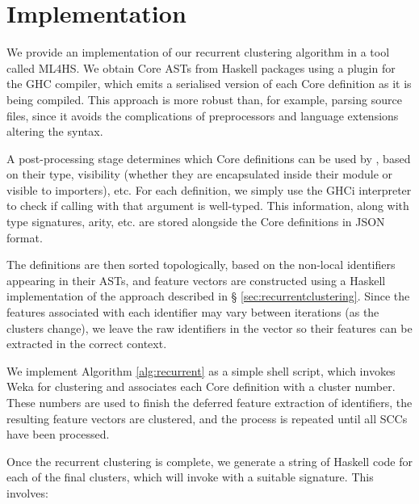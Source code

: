 \section{Implementation}
\label{sec:implementation}

We provide an implementation of our recurrent clustering algorithm in a tool
called \textsc{ML4HS}. We obtain Core ASTs from Haskell packages using a plugin
for the GHC compiler, which emits a serialised version of each Core definition
as it is being compiled. This approach is more robust than, for example, parsing
source files, since it avoids the complications of preprocessors and language
extensions altering the syntax.

A post-processing stage determines which Core definitions can be used by
\qspec{}, based on their type, visibility (whether they are encapsulated inside
their module or visible to importers), etc. For each definition, we simply use
the GHCi interpreter to check if calling \qspec{} with that argument is
well-typed. This information, along with type signatures, arity, etc. are stored
alongside the Core definitions in JSON format.

The definitions are then sorted topologically, based on the non-local
identifiers appearing in their ASTs, and feature vectors are constructed using a
Haskell implementation of the approach described in \S
\ref{sec:recurrentclustering}. Since the features associated with each
identifier may vary between iterations (as the clusters change), we leave the
raw identifiers in the vector so their features can be extracted in the correct
context.

We implement Algorithm \ref{alg:recurrent} as a simple shell script, which
invokes Weka for clustering and associates each Core definition with a cluster
number. These numbers are used to finish the deferred feature extraction of
identifiers, the resulting feature vectors are clustered, and the process is
repeated until all SCCs have been processed.

Once the recurrent clustering is complete, we generate a string of Haskell code
for each of the final clusters, which will invoke \qspec{} with a suitable
signature. This involves:


